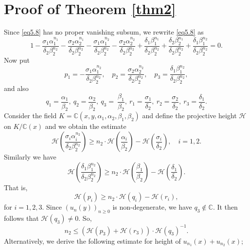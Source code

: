 \documentclass[12pt]{amsart}
\newcommand{\C}{\mbox{$\mathbb C$}}     %
\begin{document}
\section{Proof of Theorem \ref{thm2}}
Since \eqref{eq5.8} has no proper vanishing subsum, we rewrite \eqref{eq5.8} as 
\begin{equation*}\label{neq2.1}
			1-\frac{\sigma_1\alpha_1^{n_1}}{\delta_2\beta_2^{n_2}}-\frac{\sigma_2\alpha_2^{n_1}}{\delta_2\beta_2^{n_2}}-\frac{\sigma_1\alpha_1^{n_2}}{\delta_2\beta_2^{n_2}}-\frac{\sigma_2\alpha_2^{n_2}}{\delta_2\beta_2^{n_2}}+\frac{\delta_1\beta_1^{n_1}}{\delta_2\beta_2^{n_2}}+\frac{\delta_2\beta_2^{n_1}}{\delta_2\beta_2^{n_2}}+\frac{\delta_1\beta_1^{n_2}}{\delta_2\beta_2^{n_2}}=0.
\end{equation*} Now put
\begin{equation*}
			p_1=-\frac{\sigma_1\alpha_1^{n_2}}{\delta_2\beta_2^{n_2}}, \quad p_2=\frac{\sigma_2\alpha_2^{n_2}}{\delta_2\beta_2^{n_2}}, \quad p_3=\frac{\delta_1\beta_1^{n_2}}{\delta_2\beta_2^{n_2}},
		\end{equation*} and also
		\begin{equation*}
			q_1=\frac{\alpha_1}{\beta_2},~ q_2=\frac{\alpha_2}{\beta_2},~ q_3=~ \frac{\beta_1}{\beta_2},~
			r_1=\frac{\sigma_1}{\delta_2},~r_2=\frac{\sigma_2}{\delta_2}, ~ r_3=\frac{\delta_1}{\delta_2}.
		\end{equation*}
		Consider the field $K=\C(x,y,\alpha_1,\alpha_2,\beta_1,\beta_2)$ and define the projective height $\mathcal{H}$ on $K/\C(x)$ and we obtain the estimate
		\begin{equation*}
			\mathcal{H}\left(\frac{\sigma_i\alpha_i^{n_2}}{\delta_2\beta_2^{n_2}}\right)\geq n_2\cdot \mathcal{H}\left(\frac{\alpha_i}{\beta_2}\right)-\mathcal{H}\left(\frac{\sigma_i}{\delta_2}\right), \quad i=1,2.
		\end{equation*} Similarly we have 
		\begin{equation*}
			\mathcal{H}\left(\frac{\delta_1\beta_1^{n_2}}{\delta_2\beta_2^{n_2}}\right)\geq n_2\cdot \mathcal{H}\left(\frac{\beta_1}{\beta_2}\right)-\mathcal{H}\left(\frac{\delta_1}{\delta_2}\right).
		\end{equation*} That is, $$\mathcal{H}(p_i)\geq n_2 \cdot \mathcal{H}(q_i)-\mathcal{H}(r_i),$$ for $i=1,2,3$. Since $(u_n(y))_{n\geq0}$ is non-degenerate, we have $q_3\notin \C$. It then follows that $\mathcal{H}(q_3)\neq 0$. So,
		\begin{equation}\label{eq5.10}
			n_2\leq (\mathcal{H}(p_3)+\mathcal{H}(r_3))\cdot \mathcal{H}(q_3)^{-1}.
		\end{equation} Alternatively, we derive the following estimate for height of $u_{n_1}(x)+u_{n_2}(x)$;
\end{document}
